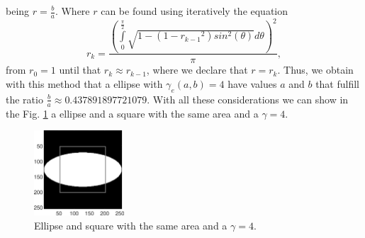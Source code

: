 being $r=\frac{b}{a}$. Where $r$ can be found using iteratively the equation
\begin{equation}
r_k=\frac{\left(\int \limits_{0}^{\frac{\pi}{2}}{\sqrt{1-\left(1-{r_{k-1}}^2\right)sin^2(\theta)}d\theta}\right)^2}{\pi},
\end{equation}
from $r_0=1$ until that $r_k\approx r_{k-1}$, where we declare that $r=r_k$.
Thus, we obtain with this method that 
a ellipse with $\gamma_e(a,b)=4$ have values $a$ and $b$ that fulfill the ratio $\frac{b}{a}\approx 0.437891897721079$.
With all these considerations we can show in the
Fig. \ref{fig:section1-gammae-square} a ellipse and a square with the same area and a $\gamma=4$.
\begin{figure}[h!]
\centering
\includegraphics[width=0.3\textwidth]{section1-gammae-square.eps}
\caption{Ellipse and square with the same area and a $\gamma=4$.}
\label{fig:section1-gammae-square}
\end{figure} 
